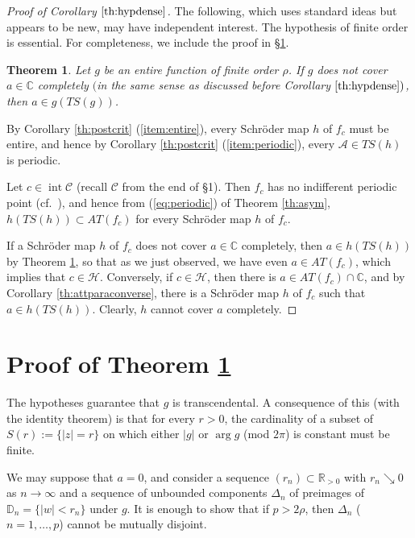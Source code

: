 \documentclass[a4paper,12pt]{amsart}
\theoremstyle{plain}
\newtheorem{mainth}{Theorem}
\theoremstyle{definition}
\theoremstyle{remark}
\numberwithin{equation}{section}
\begin{document}
\begin{proof}[Proof of Corollary $\ref{th:hypdense}$]
 The following, which uses standard ideas but appears to be new,
 may have independent interest. The hypothesis of finite order is essential.
 For completeness, we include the proof in \S \ref{sec:kysymus}.

 \begin{mainth}\label{th:Kysymus}
 Let $g$ be an entire function of finite order $\rho$.
 If $g$ does not cover $a\in{\mathbb{C}}$ completely
 $($in the same sense as discussed before Corollary $\ref{th:hypdense})$,
 then $a\in g({\mathit{TS}}(g))$.
 \end{mainth}

 By Corollary \ref{th:postcrit} (\ref{item:entire}), 
 every Schr\"oder map $h$ of $f_c$ must be entire,
 and hence by Corollary \ref{th:postcrit} (\ref{item:periodic}),
 every $\mathcal{A}\in{\mathit{TS}}(h)$ is periodic.
 
 Let $c\in{\operatorname{int}}\mathcal{C}$ (recall $\mathcal{C}$ from the end of \S 1).
 Then $f_c$ has no indifferent periodic point
 (cf.\ \cite[Theorem 4.8]{McMullen:renorm}), and hence
 from (\ref{eq:periodic}) of Theorem \ref{th:asym},
 $h({\mathit{TS}}(h))\subset{\mathit{AT}}(f_c)$ for every Schr\"oder map $h$ of $f_c$.

 If a Schr\"oder map $h$ of $f_c$ does not cover $a\in{\mathbb{C}}$ completely,
 then $a\in h({\mathit{TS}}(h))$ by Theorem \ref{th:Kysymus},
 so that as we just observed, 
 we have even $a\in{\mathit{AT}}(f_c)$, which implies that $c\in\mathcal{H}$.
 Conversely, if $c\in\mathcal{H}$, then there is $a\in{\mathit{AT}}(f_c)\cap{\mathbb{C}}$,
 and by Corollary \ref{th:attparaconverse},
 there is a Schr\"oder map $h$ of $f_c$ such that $a\in h({\mathit{TS}}(h))$.
 Clearly, $h$ cannot cover $a$ completely.
\end{proof}

\section{Proof of Theorem \ref{th:Kysymus}}\label{sec:kysymus}
The hypotheses guarantee that $g$ is transcendental.
A consequence of this (with the identity theorem) is that
for every $r>0$, the cardinality of a subset of $S(r):=\{|z|=r\}$
on which either $|g|$ or $\arg g$ (mod $2\pi$) is constant must be finite.

We may suppose that $a=0$, and consider a sequence $(r_n)\subset{\mathbb{R}}_{>0}$
with $r_n\searrow 0$ as $n\to\infty$ and a sequence of unbounded components
$\Delta_n$ of preimages of ${\mathbb{D}}_n=\{|w|<r_n\}$ under $g$.
It is enough to show that if $p>2\rho$, 
then $\Delta_n$ ($n=1,\ldots, p$) cannot be mutually disjoint.
\end{document}
